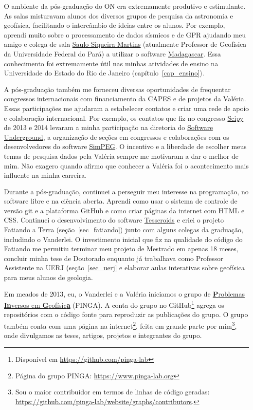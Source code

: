 \documentclass[10pt,a4paper,oneside]{book}
\newcommand{\UERJ}{Universidade do Estado do Rio de Janeiro}
\begin{document}
O ambiente da pós-graduação do ON era extremamente produtivo e estimulante.
As salas misturavam alunos dos diversos grupos de pesquisa da astronomia e
geofísica, facilitando o intercâmbio de ideias entre os alunos.
Por exemplo, aprendi muito sobre o processamento de dados sísmicos e de GPR
ajudando meu amigo e colega de sala
\href{https://www.linkedin.com/in/saulo-siqueira-martins-78770878/}{Saulo Siqueira Martins}
(atualmente Professor de Geofísica da Universidade Federal do Pará)
a utilizar o software \href{https://www.reproducibility.org/}{Madagascar}.
Essa conhecimento foi extremamente útil nas minhas atividades de ensino na
\UERJ{} (capítulo~\ref{cap_ensino}).

A pós-graduação também me forneceu diversas oportunidades de frequentar
congressos internacionais com financiamento da CAPES e de projetos da Valéria.
Essas participações me ajudaram a estabelecer contatos e criar uma rede de
apoio e colaboração internacional.
Por exemplo, os contatos que fiz no congresso
\href{https://conference.scipy.org/scipy2014/}{Scipy} de 2013 e 2014 levaram a
minha participação na diretoria do
\href{https://softwareunderground.org/}{Software Underground}, a organização
de seções em congressos e colaborações com os desenvolvedores do software
\href{https://simpeg.xyz/}{SimPEG}.
O incentivo e a liberdade de escolher meus temas de pesquisa dados pela Valéria
sempre me motivaram a dar o melhor de mim.
Não exagero quando afirmo que conhecer a Valéria foi o acontecimento mais
influente na minha carreira.

Durante a pós-graduação, continuei a perseguir meu interesse na programação,
no software libre e na ciência aberta.
Aprendi como usar o sistema de controle de versão
\href{https://git-scm.com/}{git} e a plataforma
\href{https://github.com}{GitHub} e como criar páginas da internet com HTML e
CSS.
Continuei o desenvolvimento do software \href{https://tesseroids.leouieda.com/}{Tesseroids}
e criei o projeto \href{https://www.fatiando.org}{Fatiando a Terra}
(seção~\ref{sec_fatiando}) junto com alguns colegas da graduação, includindo o
Vanderlei.
O investimento inicial que fiz na qualidade do código do Fatiando me
permitiu terminar meu projeto de Mestrado em apenas 18 meses,
concluir minha tese de Doutorado enquanto já trabalhava como Professor
Assistente na UERJ (seção~\ref{sec_uerj} e elaborar aulas interativas sobre
geofísica para meus alunos de geologia.

Em meados de 2013, eu, o Vanderlei e a Valéria iniciamos o grupo de
\href{https://www.pinga-lab.org/}{\textbf{P}roblemas \textbf{In}versos em \textbf{G}eofísic\textbf{a}}
(PINGA).
A conta do grupo no GitHub\footnote{Disponível em \url{https://github.com/pinga-lab}}
agrega os repositórios com o código fonte para reproduzir as publicações do
grupo.
O grupo também conta com uma página na internet\footnote{Página do grupo PINGA: \url{https://www.pinga-lab.org}},
feita em grande parte por mim\footnote{Sou o maior contribuidor em termos de
linhas de código geradas:
\url{https://github.com/pinga-lab/website/graphs/contributors}.},
onde divulgamos as teses, artigos, projetos e integrantes do grupo.
\end{document}
